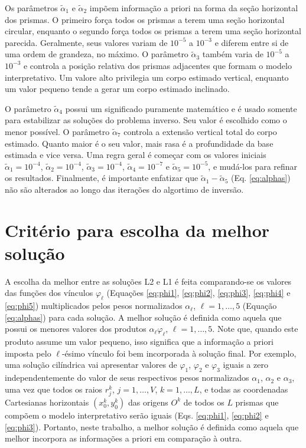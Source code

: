 Os parâmetros $\tilde{\alpha}_1$ e $\tilde{\alpha}_2$ impõem informação a priori na forma da seção horizontal dos prismas.
O primeiro força todos os prismas a terem uma seção horizontal circular, enquanto o segundo força todos os prismas a terem uma seção horizontal parecida.
Geralmente, seus valores variam de $10^{-5}$ a $10^{-3}$ e diferem entre si de uma ordem de grandeza, no máximo.
O parâmetro $\tilde{\alpha}_3$ também varia de $10^{-5}$ a $10^{-3}$ e controla a posição relativa dos prismas adjacentes que formam o modelo interpretativo.
Um valore alto privilegia um corpo estimado vertical, enquanto um valor pequeno tende a gerar um corpo estimado inclinado.

O parâmetro $\tilde{\alpha}_4$ possui um significado puramente matemático e é usado somente para estabilizar as soluções do problema inverso.
Seu valor é escolhido como o menor possível.
O parâmetro $\tilde{\alpha}_7$ controla a extensão vertical total do corpo estimado.
Quanto maior é o seu valor, mais rasa é a profundidade da base estimada e vice versa.
Uma regra geral é começar com os valores iniciais $\tilde{\alpha}_1 = 10^{-4}$, $\tilde{\alpha}_2 = 10^{-4}$, $\tilde{\alpha}_3 = 10^{-4}$, $\tilde{\alpha}_4 = 10^{-7}$ e $\tilde{\alpha}_5 = 10^{-5}$, e mudá-los para refinar os resultados.
Finalmente, é importante enfatizar que  $\tilde{\alpha}_1 - \tilde{\alpha}_5$ (Eq. \ref{eq:alphas}) não são alterados ao longo das iterações do algortimo de inversão.

\section{Critério para escolha da melhor solução}
\label{sec:criterio}

A escolha da melhor entre as soluções L2 e L1 é feita comparando-se os valores das funções dos vínculos $ \varphi_\ell $ (Equações \ref{eq:phi1}, \ref{eq:phi2}, \ref{eq:phi3}, \ref{eq:phi4} e \ref{eq:phi5}) multiplicados pelos pesos normalizados $ \alpha_\ell $, $ \ell=1,\dots,5 $ (Equação \ref{eq:alphas}) para cada solução.
A melhor solução é definida como aquela que possui os menores valores dos produtos $ \alpha_\ell \varphi_\ell  $, $ \ell=1,\dots,5 $.
Note que, quando este produto assume um valor pequeno, isso significa que a informação a priori imposta pelo $ \ell $-ésimo vínculo foi bem incorporada à solução final.
Por exemplo, uma solução cilíndrica vai apresentar valores de $ \varphi_1 $, $ \varphi_2 $ e $ \varphi_3 $ iguais a zero independentemente do valor de seus respectivos pesos normalizados $ \alpha_1 $, $ \alpha_2 $ e $ \alpha_3 $, uma vez que todos os raios $ r^k_j $, $ j=1, \dots, V $, $ k=1,\dots,L $, e todas as coordenadas Cartesianas horizontais $ (x^k_0, y^k_0) $ das origens $ O^k $ de todos os $ L $ prismas que compõem o modelo interpretativo serão iguais (Eqs. \ref{eq:phi1}, \ref{eq:phi2} e \ref{eq:phi3}).
Portanto, neste trabalho, a melhor solução é definida como aquela que melhor incorpora as informações a priori em comparação à outra.